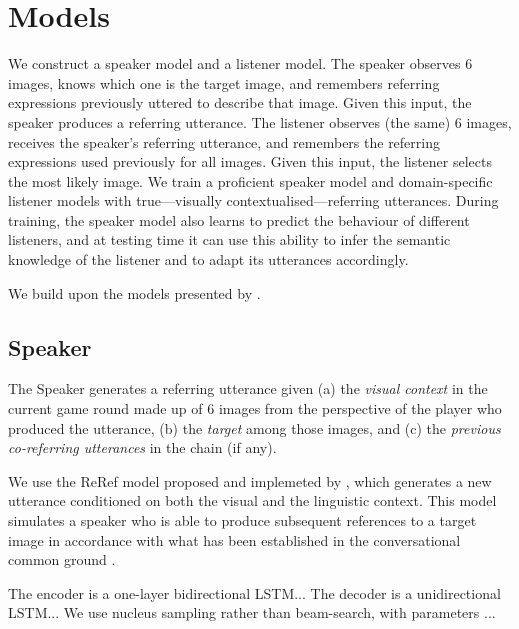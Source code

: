
\section{Models}
\label{sec:models}


We construct a speaker model and a listener model. The speaker observes 6 images, knows which one is the target image, and remembers referring expressions previously uttered to describe that image. Given this input, the speaker produces a referring utterance. The listener observes (the same) 6 images, receives the speaker's referring utterance, and remembers the referring expressions used previously for all images. Given this input, the listener selects the most likely image.
We train a proficient speaker model and domain-specific listener models with true---visually contextualised---referring utterances. During training, the speaker model also learns to predict the behaviour of different listeners, and at testing time it can use this ability to infer the semantic knowledge of the listener and to adapt its utterances accordingly. 


We build upon the models presented by \citet{takmaz-etal-2020-refer}. 

\subsection{Speaker}
\label{sec:speaker}

The Speaker generates a referring utterance given (a) the \emph{visual context} in the current game round made up of $6$ images from the perspective of the player who produced the utterance, (b) the \emph{target} among those images, and (c) the \emph{previous co-referring utterances} in the chain (if any). 


We use the ReRef model proposed and implemeted by \citet{takmaz-etal-2020-refer}, which generates a new utterance conditioned on both the visual and the linguistic context. This model simulates a speaker who is able to produce subsequent references to a target image in accordance with what has been established in the conversational common ground \cite{Clark1996,BrennanClark1996}.  

The encoder is a one-layer bidirectional LSTM... The decoder is a unidirectional LSTM... We use nucleus sampling rather than beam-search, with parameters ...



